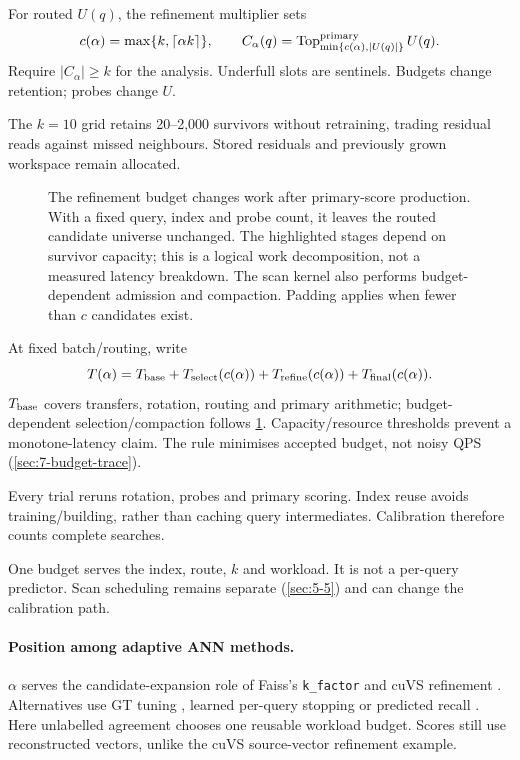 For routed $U(q)$, the refinement multiplier sets \cite{jhq}
\begin{equation}
 c(\alpha)=\max\{k,\lceil\alpha k\rceil\},\qquad
 C_\alpha(q)=\operatorname{Top}^{\rm primary}_{\min\{c(\alpha),|U(q)|\}}U(q).
 \label{eq:6-budget}
\end{equation}
Require $|C_\alpha|\geq k$ for the analysis. Underfull slots are sentinels. Budgets change retention; probes change $U$.

The $k=10$ grid retains 20--2,000 survivors without retraining, trading residual reads against missed neighbours. Stored residuals and previously grown workspace remain allocated.

\begin{figure}[tbp]
\centering

\caption[Work affected by the refinement budget]{The refinement budget changes work after primary-score
production. With a fixed query, index and probe count, it leaves the
routed candidate universe unchanged. The highlighted stages depend on
survivor capacity; this is a logical work decomposition, not a measured
latency breakdown. The scan kernel also performs budget-dependent
admission and compaction. Padding applies when fewer than $c$ candidates exist.}
\label{fig:6-budget-scope}
\end{figure}

At fixed batch/routing, write
\begin{equation}
 T(\alpha)=T_{\rm base}+T_{\rm select}(c(\alpha))+
 T_{\rm refine}(c(\alpha))+T_{\rm final}(c(\alpha)).
 \label{eq:6-cost-model}
\end{equation}
$T_{\rm base}$ covers transfers, rotation, routing and primary arithmetic; budget-dependent selection/compaction follows \cref{fig:6-budget-scope}. Capacity/resource thresholds prevent a monotone-latency claim. The rule minimises accepted budget, not noisy QPS (\cref{sec:7-budget-trace}).

Every trial reruns rotation, probes and primary scoring. Index reuse avoids training/building, rather than caching query intermediates. Calibration therefore counts complete searches.

One budget serves the index, route, $k$ and workload. It is not a per-query predictor. Scan scheduling remains separate (\cref{sec:5-5}) and can change the calibration path.

\paragraph{Position among adaptive ANN methods.}
$\alpha$ serves the candidate-expansion role of Faiss's \texttt{k\_factor} and cuVS refinement \cite{faiss_refine,cuvs_refinement}. Alternatives use GT tuning \cite{faiss_autotune}, learned per-query stopping \cite{li_termination} or predicted recall \cite{darth}. Here unlabelled agreement chooses one reusable workload budget. Scores still use reconstructed vectors, unlike the cuVS source-vector refinement example.
